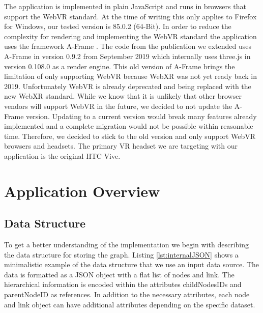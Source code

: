 The application is implemented in plain JavaScript and runs in browsers that support the WebVR standard. 
At the time of writing this only applies to Firefox for Windows, our tested version is 85.0.2 (64-Bit). 
In order to reduce the complexity for rendering and implementing the WebVR standard the application uses the framework A-Frame \cite{aframe}. The code from the publication we extended uses A-Frame in version 0.9.2 from September 2019 which internally uses three.js \cite{threejs} in version 0.108.0 as a render engine.
This old version of A-Frame brings the limitation of only supporting WebVR because WebXR was not yet ready back in 2019.
Unfortunately WebVR is already deprecated and being replaced with the new WebXR standard.
While we know that it is unlikely that other browser vendors will support WebVR in the future, we decided to not update the A-Frame version. Updating to a current version would break many features already implemented and a complete migration would not be possible within reasonable time. Therefore, we decided to stick to the old version and only support WebVR browsers and headsets.
The primary VR headset we are targeting with our application is the original HTC Vive.

\section{Application Overview}




\label{sec:applOverview}
\subsection{Data Structure}
\label{subSec:dataStruct}
To get a better understanding of the implementation we begin with describing the data structure for storing the graph.
Listing \ref{lst:internalJSON} shows a minimalistic example of the data structure that we use an input data source. The data is formatted as a JSON object with a flat list of nodes and link. The hierarchical information is encoded within the attributes childNodesIDs and parentNodeID as references. 
In addition to the necessary attributes, each node and link object can have additional attributes depending on the specific dataset.

